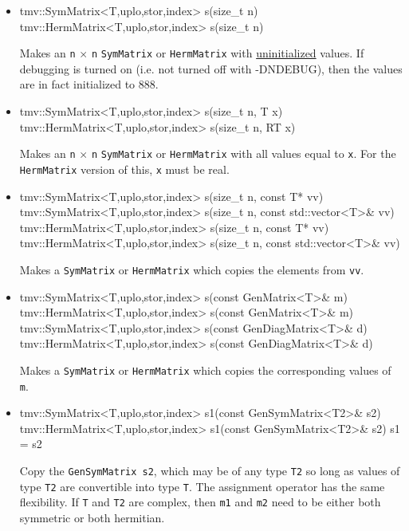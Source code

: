 \documentclass[twoside,letterpaper,11pt]{article}
\renewcommand{\tt}[1]{{\lstinline {#1}}}
\begin{document}
\begin{itemize}
\item 
\begin{tmvcode}
tmv::SymMatrix<T,uplo,stor,index> s(size_t n)
tmv::HermMatrix<T,uplo,stor,index> s(size_t n)
\end{tmvcode}
Makes an \tt{n} $\times$ \tt{n} \tt{SymMatrix} or \tt{HermMatrix}
with \underline{uninitialized} values.
If debugging is turned on (i.e. not turned off
with -DNDEBUG), then the values are in fact initialized to 888.  

\item
\begin{tmvcode}
tmv::SymMatrix<T,uplo,stor,index> s(size_t n, T x)
tmv::HermMatrix<T,uplo,stor,index> s(size_t n, RT x)
\end{tmvcode}
Makes an \tt{n} $\times$ \tt{n} \tt{SymMatrix} or \tt{HermMatrix} 
with all values equal to \tt{x}.
For the \tt{HermMatrix} version of this, \tt{x} must be real.

\item
\begin{tmvcode}
tmv::SymMatrix<T,uplo,stor,index> s(size_t n, const T* vv)
tmv::SymMatrix<T,uplo,stor,index> s(size_t n, 
      const std::vector<T>& vv)
tmv::HermMatrix<T,uplo,stor,index> s(size_t n, const T* vv)
tmv::HermMatrix<T,uplo,stor,index> s(size_t n, 
      const std::vector<T>& vv)
\end{tmvcode}
Makes a \tt{SymMatrix} or \tt{HermMatrix} which copies the elements from \tt{vv}.

\item 
\begin{tmvcode}
tmv::SymMatrix<T,uplo,stor,index> s(const GenMatrix<T>& m)
tmv::HermMatrix<T,uplo,stor,index> s(const GenMatrix<T>& m)
tmv::SymMatrix<T,uplo,stor,index> s(const GenDiagMatrix<T>& d)
tmv::HermMatrix<T,uplo,stor,index> s(const GenDiagMatrix<T>& d)
\end{tmvcode}
Makes a \tt{SymMatrix} or \tt{HermMatrix} which copies the corresponding values of \tt{m}.

\item
\begin{tmvcode}
tmv::SymMatrix<T,uplo,stor,index> s1(const GenSymMatrix<T2>& s2)
tmv::HermMatrix<T,uplo,stor,index> s1(const GenSymMatrix<T2>& s2)
s1 = s2
\end{tmvcode}
Copy the \tt{GenSymMatrix s2}, which may be of any type \tt{T2} so long
as values of type \tt{T2} are convertible into type \tt{T}.
The assignment operator has the same flexibility.
If \tt{T} and \tt{T2} are complex, then \tt{m1} and \tt{m2} need to be
either both symmetric or both hermitian.


\end{itemize}
\end{document}
